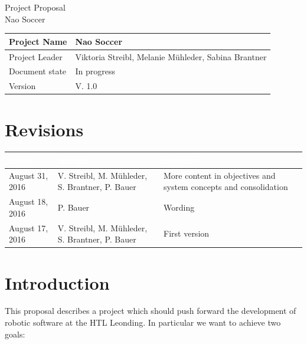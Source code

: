 \documentclass[12pt]{article}
\theoremstyle{definition}
\newcommand{\projectname}{Nao Soccer}
\newcommand{\productname}{Nao Soccer}
\newcommand{\projectleader}{Viktoria Streibl, Melanie Mühleder, Sabina Brantner}
\newcommand{\documentstatus}{In progress}
\newcommand{\version}{V. 1.0}
\begin{document}
\begin{titlepage}
\begin{flushright}
\end{flushright}

\vspace{10em}

\begin{center}
{\Huge Project Proposal} \\[3em]
{\LARGE \productname} \\[3em]
\end{center}

\begin{flushleft}
\begin{tabular}{|l|l|}
\hline
Project Name & \projectname \\ \hline
Project Leader & \projectleader \\ \hline
Document state & \documentstatus \\ \hline
Version & \version \\ \hline
\end{tabular}
\end{flushleft}

\end{titlepage}
\section*{Revisions}
\begin{tabular}{|p{.2\linewidth}|p{.3\linewidth}|p{.42\linewidth}|}
\hline
\cellcolor[gray]{0.5}\textcolor{white}{Date} & \cellcolor[gray]{0.45}\textcolor{white}{Author} & \cellcolor[gray]{0.5}\textcolor{white}{Change} \\ \hline
August 31, 2016&V. Streibl, M. Mühleder, S. Brantner, P. Bauer&More content in objectives and system concepts and consolidation \\ \hline
August 18, 2016&P. Bauer&Wording \\ \hline
August 17, 2016&V. Streibl, M. Mühleder, S. Brantner, P. Bauer&First version \\ \hline
\end{tabular}
\pagebreak

\tableofcontents
\pagebreak

\section{Introduction}
This proposal describes a project which should push forward the development of robotic software at the HTL Leonding. In particular we want to achieve two goals:
\end{document}

